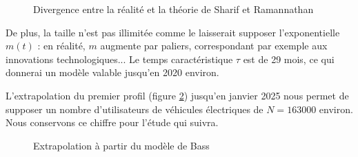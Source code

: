 \documentclass[10pt]{article}
\begin{document}
		\begin{figure}[h!]
			\caption{Divergence entre la réalité et la théorie de Sharif et Ramannathan \label{fig.diverSharifRam}}
			\begin{center}
			\end{center}
		\end{figure}
		
		
		De plus, la taille n'est pas illimitée comme le laisserait supposer l'exponentielle $m(t)$ : en réalité, $m$ augmente par paliers, correspondant par exemple aux innovations technologiques... Le temps caractéristique $\tau$ est de 29 mois, ce qui donnerai un modèle valable jusqu'en 2020 environ.
		
		L'extrapolation du premier profil (figure \ref{fig.extraBass}) jusqu'en janvier 2025 nous permet de supposer un nombre d'utilisateurs de véhicules électriques de $N = 163 000$ environ. Nous conservons ce chiffre pour l'étude qui suivra.
		
		\begin{figure}[h!]
			\caption{Extrapolation à partir du modèle de Bass \label{fig.extraBass}}
			\begin{center}
			\end{center}
		\end{figure}
		
\end{document}
